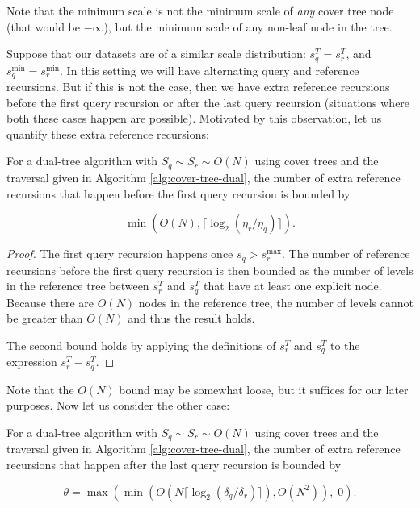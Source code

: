 Note that the minimum scale is not the minimum scale of {\it any} cover tree
node (that would be $-\infty$), but the minimum scale of any non-leaf node in
the tree.

Suppose that our datasets are of a similar scale distribution: $s_q^T = s_r^T$,
and $s_q^{\min} = s_r^{\min}$.  In this setting we will have alternating query
and reference recursions.  But if this is not the case, then we have extra
reference recursions before the first query recursion or after the last query
recursion (situations where both these cases happen are possible).  Motivated by
this observation, let us quantify these extra reference recursions:

\begin{lemma}
\label{lem:extcase1}
For a dual-tree algorithm with $S_q \sim S_r \sim O(N)$ using cover trees and
the traversal given in Algorithm \ref{alg:cover-tree-dual}, the number of extra
reference recursions that happen before the first query recursion is bounded by

\begin{equation}
\min\left(O(N), \lceil \log_2(\eta_r / \eta_q) \rceil\right).
\end{equation}
\end{lemma}

\begin{proof}
The first query recursion happens once $s_q > s_r^{\max}$.  The number of
reference recursions before the first query recursion is then bounded as the
number of levels in the reference tree between $s_r^T$ and $s_q^T$ that have at
least one explicit node.  Because there are $O(N)$ nodes in the reference tree,
the number of levels cannot be greater than $O(N)$ and thus the result holds.

The second bound holds by applying the definitions of $s_r^T$ and $s_q^T$ to the
expression $s_r^T - s_q^T$.
\end{proof}

Note that the $O(N)$ bound may be somewhat loose, but it suffices for our later
purposes.  Now let us consider the other case:

\begin{lemma}
\label{lem:extcase3}
For a dual-tree algorithm with $S_q \sim S_r \sim O(N)$ using cover trees and
the traversal given in Algorithm \ref{alg:cover-tree-dual}, the number of extra
reference recursions that happen after the last query recursion is bounded by

\begin{equation}
\theta = \max\left(\min\left(O(N \lceil \log_2(\delta_q / \delta_r) \rceil),
O(N^2)\right), \; 0\right).
\end{equation}
\end{lemma}


